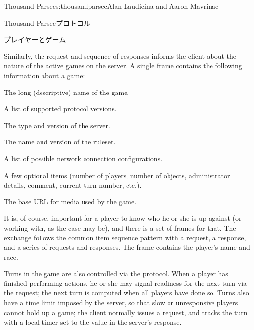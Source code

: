 \begin{aosachapter}{Thousand Parsec}{s:thousandparsec}{Alan Laudicina and Aaron Mavrinac}
\begin{aosasect1}{Thousand Parsecプロトコル}
\begin{aosasect2}{プレイヤーとゲーム}
\begin{aosaitemize}
\end{aosaitemize}

Similarly, the  request and sequence of 
responses informs the client about the nature of the active games on
the server. A single  frame contains the following
information about a game:

\begin{aosaitemize}

  \item The long (descriptive) name of the game.

  \item A list of supported protocol versions.

  \item The type and version of the server.

  \item The name and version of the ruleset.

  \item A list of possible network connection configurations.

  \item A few optional items (number of players, number of objects,
  administrator details, comment, current turn number, etc.).

  \item The base URL for media used by the game.

\end{aosaitemize}

It is, of course, important for a player to know who he or she is up
against (or working with, as the case may be), and there is a set of
frames for that. The exchange follows the common item sequence pattern
with a  request, a 
response, and a series of  requests and
 responses. The  frame contains
the player's name and race.

Turns in the game are also controlled via the protocol. When a player
has finished performing actions, he or she may signal readiness for
the next turn via the  request; the next turn is
computed when all players have done so. Turns also have a time limit
imposed by the server, so that slow or unresponsive players cannot
hold up a game; the client normally issues a 
request, and tracks the turn with a local timer set to the value in
the server's  response.


\end{aosasect2}
\end{aosasect1}
\end{aosachapter}
